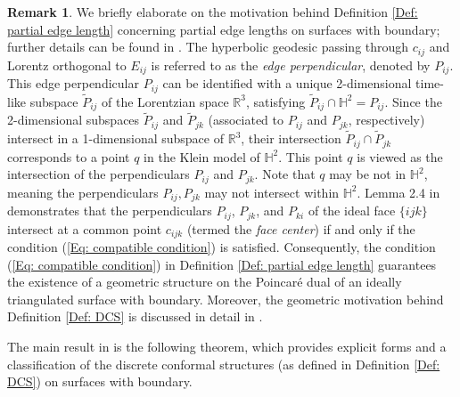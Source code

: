 \documentclass[12pt]{amsart}
\theoremstyle{definition}
\newtheorem{remark}[theorem]{Remark}
\begin{document}
\begin{remark}\label{Rmk: GM}
We briefly elaborate on the motivation behind Definition \ref{Def: partial edge length} concerning partial edge lengths on surfaces with boundary; further details can be found in \cite{X-Z DCS1}. 
The hyperbolic geodesic passing through $c_{ij}$ and Lorentz orthogonal to $E_{ij}$ is referred to as the \emph{edge perpendicular}, denoted by $P_{ij}$. 
This edge perpendicular $P_{ij}$ can be identified with a unique 2-dimensional time-like subspace $\widetilde{P}_{ij}$ of the Lorentzian space $\mathbb{R}^3$, satisfying $\widetilde{P}_{ij} \cap \mathbb{H}^2 = P_{ij}$. 
Since the 2-dimensional subspaces $\widetilde{P}_{ij}$ and $\widetilde{P}_{jk}$ (associated to $P_{ij}$ and $P_{jk}$, respectively) intersect in a 1-dimensional subspace of $\mathbb{R}^3$, 
their intersection $\widetilde{P}_{ij} \cap \widetilde{P}_{jk}$ corresponds to a point $q$ in the Klein model of $\mathbb{H}^2$. 
This point $q$ is viewed as the intersection of the perpendiculars $P_{ij}$ and $P_{jk}$. 
Note that $q$ may be not in $\mathbb{H}^2$, meaning the perpendiculars $P_{ij}, P_{jk}$ may not intersect within $\mathbb{H}^2$.
Lemma 2.4 in \cite{X-Z DCS1} demonstrates that the perpendiculars $P_{ij}$, $P_{jk}$, and $P_{ki}$ of the ideal face $\{ijk\}$ intersect at a common point $c_{ijk}$ (termed the \emph{face center}) if and only if the condition (\ref{Eq: compatible condition}) is satisfied. 
Consequently, the condition (\ref{Eq: compatible condition}) in Definition \ref{Def: partial edge length} guarantees the existence of a geometric structure on the Poincar\'{e} dual of an ideally triangulated surface with boundary.
Moreover, the geometric motivation behind Definition \ref{Def: DCS} is discussed in detail in \cite[Remark 1.3]{X-Z DCS1}. 
\end{remark}

The main result in \cite{X-Z DCS1} is the following theorem, which provides explicit forms and a classification of the discrete conformal structures (as defined in Definition \ref{Def: DCS}) on surfaces with boundary.
\end{document}
